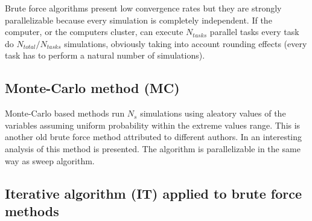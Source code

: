 \documentclass[review,authoryear]{elsarticle}
\begin{document}
Brute force algorithms present low convergence rates but they are strongly
parallelizable because every simulation is completely independent. If the
computer, or the computers cluster, can execute $N_{tasks}$ parallel tasks
every task do $N_{total}/N_{tasks}$ simulations, obviously taking into account
rounding effects (every task has to perform a natural number of simulations).

\subsection{Monte-Carlo method (MC)}

Monte-Carlo based methods run $N_s$ simulations using aleatory values of the
variables assuming uniform probability within the extreme values range. This is
another old brute force method attributed to different authors. In
\citet{AtanassovDimov08} an interesting analysis of this method is presented.
The algorithm is parallelizable in the same way as sweep algorithm.

\subsection{Iterative algorithm (IT) applied to brute force methods}
\end{document}
